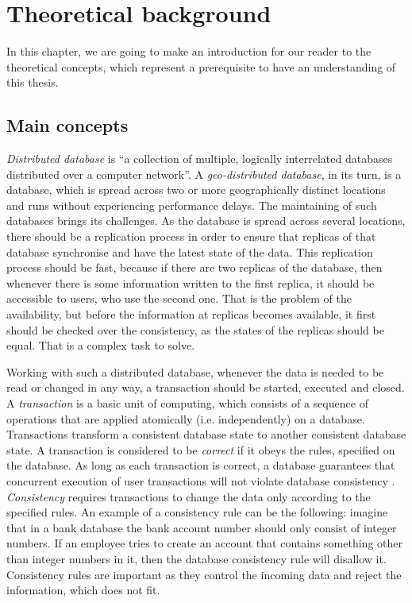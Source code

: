 \chapter{Theoretical background}
\label{Background}

In this chapter, we are going to make an introduction for our reader to the theoretical concepts, which represent a prerequisite to have an understanding of this thesis.

\section{Main concepts}
\label{Background-Main}

\textit{Distributed database} is ``a collection of multiple, logically interrelated databases distributed over a computer network''\cite{11}. A \textit{geo-distributed database}, in its turn, is a database, which is spread across two or more geographically distinct locations and runs without experiencing performance delays. The maintaining of such databases brings its challenges. As the database is spread across several locations, there should be a replication process in order to ensure that replicas of that database synchronise and have the latest state of the data. This replication process should be fast, because if there are two replicas of the database, then whenever there is some information written to the first replica, it should be accessible to users, who use the second one. That is the problem of the availability, but before the information at replicas becomes available, it first should be checked over the consistency, as the states of the replicas should be equal. That is a complex task to solve. 

Working with such a distributed database, whenever the data is needed to be read or changed in any way, a transaction should be started, executed and closed. A \textit{transaction} is a basic unit of computing, which consists of a sequence of operations that are applied atomically (i.e. independently) on a database. Transactions transform a consistent database state to another consistent database state. A transaction is considered to be \textit{correct} if it obeys the rules, specified on the database. As long as each transaction is correct, a database guarantees that concurrent execution of user transactions will not violate database consistency \cite{11}. \textit{Consistency} requires transactions to change the data only according to the specified rules. An example of a consistency rule can be the following: imagine that in a bank database the bank account number should only consist of integer numbers. If an employee tries to create an account that contains something other than integer numbers in it, then the database consistency rule will disallow it. Consistency rules are important as they control the incoming data and reject the information, which does not fit.

